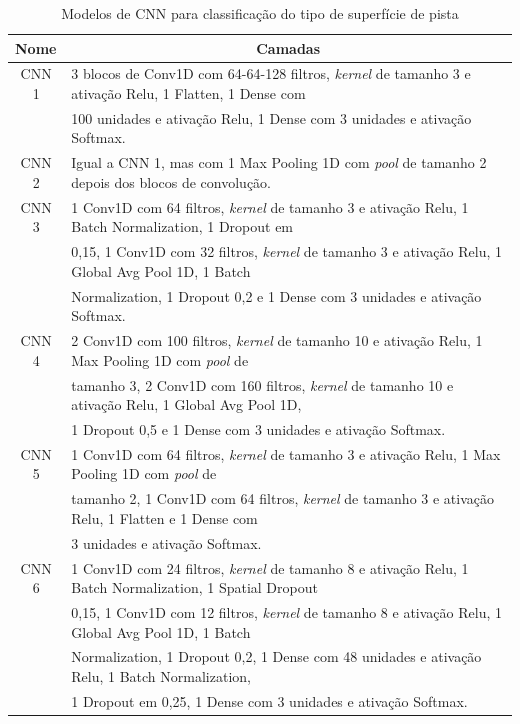 \begin{table}[h!]
\scriptsize
\centering
\caption{Modelos de CNN para classificação do tipo de superfície de pista} 
\label{table:cnn_superficie_pista_1}
\begin{tabular}{cl}
\toprule 
\multicolumn{1}{l}{\textbf{Nome}} & 
\multicolumn{1}{c}{\textbf{Camadas}} \\ \midrule
CNN 1 &
3 blocos de Conv1D com 64-64-128 filtros, \textit{kernel} de tamanho 3 e ativação Relu, 1 Flatten, 1 Dense com \\ & 100 unidades e ativação Relu, 1 Dense com 3 unidades e ativação Softmax. \\ \midrule
CNN 2 & Igual a CNN 1, mas com 1 Max Pooling 1D com \textit{pool} de tamanho 2 depois dos blocos de convolução. \\ \midrule
CNN 3 & 1 Conv1D com 64 filtros,  \textit{kernel} de tamanho 3 e ativação Relu, 1 Batch Normalization, 1 Dropout em \\ & 0,15,  1 Conv1D com 32 filtros, \textit{kernel} de tamanho 3 e ativação Relu, 1 Global Avg Pool 1D, 1 Batch \\ & Normalization,  1 Dropout 0,2 e 1 Dense com 3 unidades e ativação Softmax.
 \\ \midrule
CNN 4 & 2 Conv1D com 100 filtros, \textit{kernel} de tamanho 10 e ativação Relu, 1 Max Pooling 1D com \textit{pool} de \\ & tamanho 3, 2 Conv1D com 160 filtros, \textit{kernel} de tamanho 10 e ativação Relu, 1 Global Avg Pool 1D, \\ &  1 Dropout 0,5 e 1 Dense com 3 unidades e ativação Softmax.
 \\ \midrule
CNN 5 & 1 Conv1D com 64 filtros, \textit{kernel} de tamanho 3 e ativação Relu, 1 Max Pooling 1D com \textit{pool} de \\ & tamanho 2, 1  Conv1D com 64 filtros, \textit{kernel} de tamanho 3 e ativação Relu, 1 Flatten e 1 Dense com \\ & 3 unidades e ativação  Softmax.
 \\ \midrule
CNN 6 & 1 Conv1D com 24 filtros, \textit{kernel} de tamanho 8 e ativação Relu, 1 Batch Normalization, 1 Spatial Dropout \\ & 0,15, 1  Conv1D com 12 filtros, \textit{kernel} de tamanho 8 e ativação Relu, 1 Global Avg Pool 1D, 1 Batch \\ & Normalization,  1 Dropout 0,2, 1 Dense com 48 unidades e ativação Relu, 1 Batch Normalization,  \\ & 1 Dropout em 0,25, 1 Dense com  3 unidades e ativação Softmax. \\ \midrule

\end{tabular}
\end{table}
